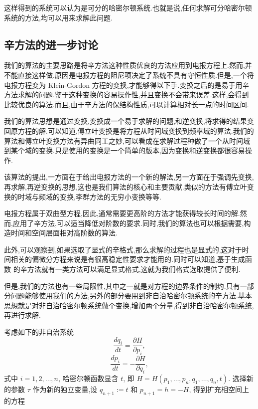这样得到的系统可以认为是可分的哈密尔顿系统.也就是说,任何求解可分哈密尔顿系统的方法,均可以用来求解此问题.

\subsection{辛方法的进一步讨论}
我们的算法的主要思路是将辛方法这种性质优良的方法应用到电报方程上.然而,并不能直接这样做.原因是电报方程的阻尼项决定了系统不具有守恒性质.但是,一个将电报方程变为 Klein-Gordon 方程的变换,才能够得以下手.变换之后的是易于用辛方法求解的问题.鉴于这种变换的容易操作性,并且变换不会带来误差.这样,会得到比较优良的算法.而且,由于辛方法的保结构性质,可以计算相对长一点的时间区间.

我们的算法思想是通过变换,变换成一个易于求解的问题,和逆变换,将求得的结果变回原方程的解.可以知道,傅立叶变换是将方程从时间域变换到频率域的算法.我们的算法和傅立叶变换方法有异曲同工之妙,可以看成在求解过程种做了一个从时间域到某个域的变换.只是使用的变换是一个简单的版本,因为变换和逆变换都很容易操作.

该算法的提出,一方面在于给出电报方法的一个新的解法,另一方面在于强调先变换,再求解,再逆变换的思想,这也是我们算法的核心和主要贡献.类似的方法有傅立叶变换的时域与频域的变换,李群方法的无穷小变换等等.

电报方程属于双曲型方程,因此,通常需要更高阶的方法才能获得较长时间的解.然而,应用了辛方法,可以适当降低对阶数的要求.同时,我们的算法也可以根据需要,构造时间和空间层面相对高阶数的算法.

此外,可以观察到,如果选取了显式的辛格式,那么求解的过程也是显式的,这对于时间相关的偏微分方程来说是有很高稳定性要求才能用的.同时可以知道,基于生成函数 \cite{feng2010symplectic} 的辛方法就有一类方法可以满足显式格式,这就为我们格式选取提供了便利.

但是,我们的方法也有一些局限性,其中之一就是对方程的边界条件的制约.只有一部分问题能够使用我们的方法,另外的部分要用到非自治哈密尔顿系统的辛方法.基本思想就是对非自治哈密尔顿系统做个变换,增加两个分量,得到非自治哈密尔顿系统,再进行求解.

考虑如下的非自治系统
\begin{equation*}
	\frac{dq_i}{dt}=\frac{\partial H}{\partial p_i},
\end{equation*}
\begin{equation*}
	\frac{dp_i}{dt}=-\frac{\partial H}{\partial q_i},
\end{equation*}
式中 $i=1,2,\ldots,n$, 哈密尔顿函数显含 $t$, 即 $H=H(p_1,\ldots,p_n,q_1,\ldots,q_n,t)$. 选择新的参数 $\tau$ 作为新的独立变量,设 $q_{n+1}:=t$ 和 $p_{n+1}=h=-H$, 得到扩充相空间上的方程

